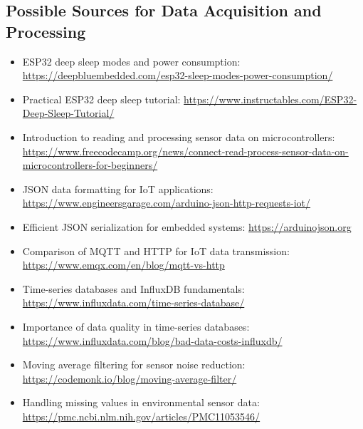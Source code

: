 \subsection*{Possible Sources for Data Acquisition and Processing}

\begin{itemize}
    \item ESP32 deep sleep modes and power consumption:  
    \url{https://deepbluembedded.com/esp32-sleep-modes-power-consumption/}

    \item Practical ESP32 deep sleep tutorial:  
    \url{https://www.instructables.com/ESP32-Deep-Sleep-Tutorial/}

    \item Introduction to reading and processing sensor data on microcontrollers:  
    \url{https://www.freecodecamp.org/news/connect-read-process-sensor-data-on-microcontrollers-for-beginners/}
    
    \item JSON data formatting for IoT applications:  
    \url{https://www.engineersgarage.com/arduino-json-http-requests-iot/}

    \item Efficient JSON serialization for embedded systems:  
    \url{https://arduinojson.org}

    \item Comparison of MQTT and HTTP for IoT data transmission:  
    \url{https://www.emqx.com/en/blog/mqtt-vs-http}

    \item Time-series databases and InfluxDB fundamentals:  
    \url{https://www.influxdata.com/time-series-database/}

    \item Importance of data quality in time-series databases:  
    \url{https://www.influxdata.com/blog/bad-data-costs-influxdb/}

    \item Moving average filtering for sensor noise reduction:  
    \url{https://codemonk.io/blog/moving-average-filter/}

    \item Handling missing values in environmental sensor data:  
    \url{https://pmc.ncbi.nlm.nih.gov/articles/PMC11053546/}
\end{itemize}

